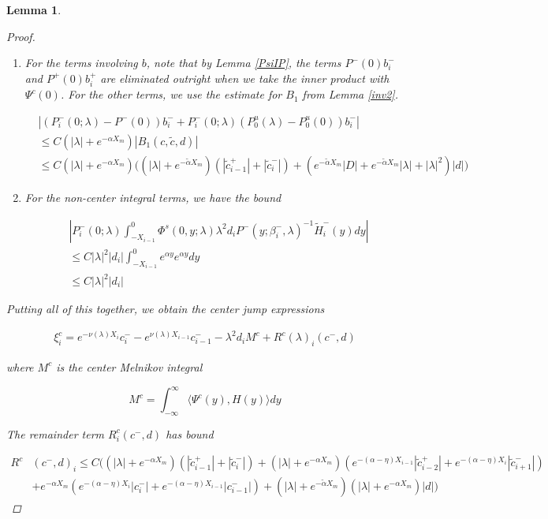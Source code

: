 \documentclass[12pt]{article}
\newtheorem{lemma}{Lemma}
\begin{document}
\begin{lemma}
\begin{proof}
\begin{enumerate}
\item For the terms involving $b$, note that by Lemma \ref{PsiIP}, the terms $P^-(0) b_i^-$ and $P^+(0)b_i^+$ are eliminated outright when we take the inner product with $\Psi^c(0)$. For the other terms, we use the estimate for $B_1$ from Lemma \ref{inv2}.

\begin{align*}
&|(P_i^-(0; \lambda) - P^-(0))b_i^- + P_i^-(0; \lambda)(P_0^u(\lambda) - P_0^u(0))b_i^-| \\
&\leq C(|\lambda| + e^{-\alpha X_m}) |B_1(c, \tilde{c}, d)| \\
&\leq C(|\lambda| + e^{-\alpha X_m}) \Big( 
(|\lambda| + e^{-\tilde{\alpha}X_m})( |\tilde{c}_{i-1}^+| + |\tilde{c}_i^-|)
+  ( e^{-\tilde{\alpha}X_m} |D| + e^{-\tilde{\alpha}X_m}|\lambda| + |\lambda|^2)|d| \Big)
\end{align*}

\item For the non-center integral terms, we have the bound

\begin{align*}
&\left| P_i^-(0; \lambda) 
\int_{-X_{i-1}}^0 \Phi^s(0, y; \lambda) \lambda^2 d_i P^-(y; \beta_i^-, \lambda)^{-1} \tilde{H}_i^-(y) dy \right| \\
&\leq C |\lambda|^2 |d_i| \int_{-X_{i-1}}^0 e^{\alpha y} e^{\alpha y} dy \\
&\leq C |\lambda|^2 |d_i|
\end{align*}

\end{enumerate}

Putting all of this together, we obtain the center jump expressions

\begin{align*}
\xi^c_i = e^{-\nu(\lambda) X_i} c_i^- - e^{\nu(\lambda) X_{i-1}} c_{i-1}^- - \lambda^2 d_i M^c + R^c(\lambda)_i(c^-, d)
\end{align*}

where $M^c$ is the center Melnikov integral

\[
M^c = \int_{-\infty}^\infty \langle \Psi^c(y), H(y) \rangle dy 
\]

The remainder term $R^c_i(c^-, d)$ has bound

\begin{align*}
R^c&(c^-, d)_i \leq C \Big(
(|\lambda| + e^{-\alpha X_m})(|\tilde{c}_{i-1}^+| + |\tilde{c}_{i}^-|) + (|\lambda| + e^{-\alpha X _m})( e^{-(\alpha - \eta) X_{i-1}} |\tilde{c}_{i-2}^+| + e^{-(\alpha - \eta) X_i} |\tilde{c}_{i+1}^-|)  \\
&+ e^{-\alpha X_m}( e^{-(\alpha - \eta) X_i}|c_i^-| + e^{-(\alpha - \eta) X_{i-1}}|c_{i-1}^-| )
+ (|\lambda| + e^{-\tilde{\alpha} X_m})(|\lambda| + e^{-\alpha X_m})|d|
\Big)
\end{align*}


\end{proof}
\end{lemma}
\end{document}
